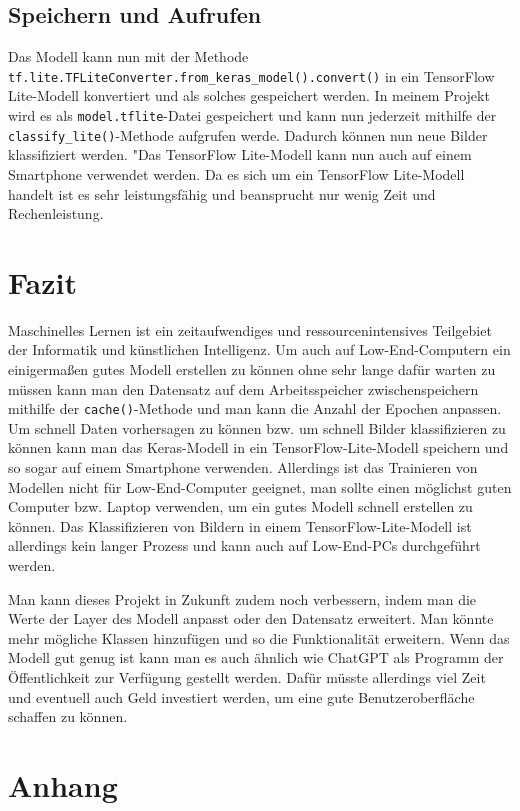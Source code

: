 \documentclass[11pt,oneside]{report}
\begin{document}
\section{Speichern und Aufrufen}
Das Modell kann nun mit der Methode \verb+tf.lite.TFLiteConverter.from_keras_model().convert()+ in ein TensorFlow Lite-Modell konvertiert und als solches gespeichert werden. In meinem Projekt wird es als \verb+model.tflite+-Datei gespeichert und kann nun jederzeit mithilfe der \verb+classify_lite()+-Methode aufgrufen werde. Dadurch können nun neue Bilder klassifiziert werden. "Das TensorFlow Lite-Modell kann nun auch auf einem Smartphone verwendet werden. Da es sich um ein TensorFlow Lite-Modell handelt ist es sehr leistungsfähig und beansprucht nur wenig Zeit und Rechenleistung.


\chapter{Fazit}
Maschinelles Lernen ist ein zeitaufwendiges und ressourcenintensives Teilgebiet der Informatik und künstlichen Intelligenz. Um auch auf Low-End-Computern ein einigermaßen gutes Modell erstellen zu können ohne sehr lange dafür warten zu müssen kann man den Datensatz auf dem Arbeitsspeicher zwischenspeichern mithilfe der \verb+cache()+-Methode und man kann die Anzahl der Epochen anpassen.  Um schnell Daten vorhersagen zu können bzw. um schnell Bilder klassifizieren zu können kann man das Keras-Modell in ein TensorFlow-Lite-Modell speichern und so sogar auf einem Smartphone verwenden. Allerdings ist das Trainieren von Modellen nicht für Low-End-Computer geeignet, man sollte einen möglichst guten Computer bzw. Laptop verwenden, um ein gutes Modell schnell erstellen zu können. Das Klassifizieren von Bildern in einem TensorFlow-Lite-Modell ist allerdings kein langer Prozess und kann auch auf Low-End-PCs durchgeführt werden.

Man kann dieses Projekt in Zukunft zudem noch verbessern, indem man die Werte der Layer des Modell anpasst oder den Datensatz erweitert. Man könnte mehr mögliche Klassen hinzufügen und so die Funktionalität erweitern. Wenn das Modell gut genug ist kann man es auch ähnlich wie ChatGPT als Programm der Öffentlichkeit zur Verfügung gestellt werden. Dafür müsste allerdings viel Zeit und eventuell auch Geld investiert werden, um eine gute Benutzeroberfläche schaffen zu können.


\appendix
\chapter{Anhang}
\end{document}
